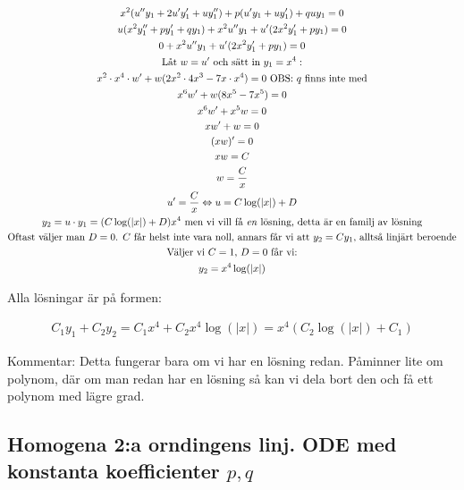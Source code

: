\begin{equation*}
  \begin{gathered}
    x^2(u^{\prime\prime}y_1+2u^{\prime}y_{1}^{\prime}+uy_{1}^{\prime\prime})+p(u^{\prime}y_1+uy_{1}^{\prime})+quy_1=0\\
    u(x^2y_{1}^{\prime\prime}+py_{1}^{\prime}+qy_{1})+x^2u^{\prime\prime}y_1+u^{\prime}(2x^2y_{1}^{\prime}+py_1)=0\\
    0+x^2u^{\prime\prime}y_1+u^{\prime}(2x^2y_{1}^{\prime}+py_1)=0\\
    \text{Låt } w = u^{\prime} \text{ och sätt in } y_1=x^4:\\
    x^2\cdot x^4\cdot w^{\prime}+w(2x^2\cdot4x^3-7x\cdot x^4)=0 \text{ OBS: $q$ finns inte med}\\
    x^6w^{\prime}+w(8x^5-7x^5)=0\\
    x^6w^{\prime}+x^5w=0\\
    xw^{\prime}+w=0\\
    (xw)^{\prime}=0\\
    xw=C\\
    w=\dfrac{C}{x}\\
    u^{\prime}=\dfrac{C}{x}\Leftrightarrow u=C\log(|x|)+D\\
    y_2 = u\cdot y_1 = (C\log(|x|)+D)x^4 \text{ men vi vill få \textit{en} lösning, detta är en familj av lösning}\\
    \text{Oftast väljer man $D=0$. $C$ får helst inte vara noll, annars får vi att $y_2=Cy_1$, alltså linjärt beroende}\\
     \text{Väljer vi $C=1$, $D=0$ får vi:}\\
     y_2=x^4\log(|x|)
  \end{gathered}
\end{equation*}
\par\bigskip
\noindent Alla lösningar är på formen:


\begin{equation*}
  \begin{gathered}
    C_1y_1+C_2y_2=C_1x^4+C_2x^4\log(|x|)=x^4(C_2\log(|x|)+C_1)
  \end{gathered}
\end{equation*}
\par\bigskip
\noindent Kommentar: Detta fungerar bara om vi har en lösning redan. Påminner lite om polynom, där om man redan har en lösning så kan vi dela bort den och få ett polynom med lägre grad.

\subsection{Homogena 2:a orndingens linj. ODE med konstanta koefficienter $p,q$}\hfill\\

